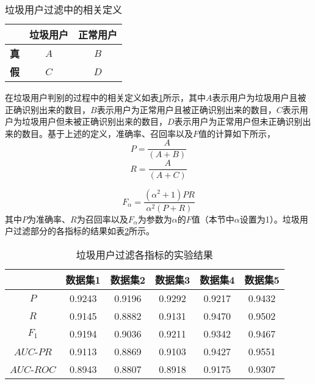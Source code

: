\begin{table}[!ht]
\centering
\caption{垃圾用户过滤中的相关定义}
\label{tab:spam}
\begin{tabular}{ |c|c|c| }
\hline
 & \textbf{垃圾用户} & \textbf{正常用户}\\
\hline
\textbf{真} & $A$ & $B$ \\
\hline
\textbf{假} & $C$ & $D$ \\
\hline
\end{tabular}
\end{table}
在垃圾用户判别的过程中的相关定义如表\ref{tab:spam}所示，其中$A$表示用户为垃圾用户且被正确识别出来的数目，$B$表示用户为正常用户且被正确识别出来的数目，$C$表示用户为垃圾用户但未被正确识别出来的数目，$D$表示用户为正常用户但未正确识别出来的数目。基于上述的定义，准确率、召回率以及$F$值的计算如下所示，
\begin{equation}
\label{eq:spamP}
	P = \frac{A}{\left(A+B\right)}
\end{equation}
\begin{equation}
\label{eq:spamR}
	R = \frac{A}{\left(A+C\right)}
\end{equation}

\begin{equation}
\label{eq:spamF}
	F_\alpha =  \frac{\left(\alpha^2+1\right)PR}{\alpha^2\left(P+R\right)}
\end{equation}
其中$P$为准确率、$R$为召回率以及$F_\alpha$为参数为$\alpha$的$F$值（本节中$\alpha$设置为1）。垃圾用户过滤部分的各指标的结果如表\ref{tab:spamRes}所示。

\begin{table}[!ht]
\centering
\caption{垃圾用户过滤各指标的实验结果}
\label{tab:spamRes}
\begin{tabular}{ |c|c|c|c|c|c| }
\hline
 & \textbf{数据集1} & \textbf{数据集2} & \textbf{数据集3} & \textbf{数据集4} & \textbf{数据集5}\\
\hline
$P$ & 0.9243 & 0.9196 & 0.9292 & 0.9217 & 0.9432 \\
\hline
$R$ & 0.9145 & 0.8882 & 0.9131 & 0.9470 & 0.9502 \\
\hline
$F_1$ & 0.9194 & 0.9036 & 0.9211 & 0.9342 & 0.9467 \\
\hline
$AUC$-$PR$ & 0.9113 & 0.8869 & 0.9103 & 0.9427 & 0.9551 \\
\hline
$AUC$-$ROC$ & 0.8943 & 0.8807 & 0.8918 & 0.9175 & 0.9307 \\
\hline
\end{tabular}
\end{table}

